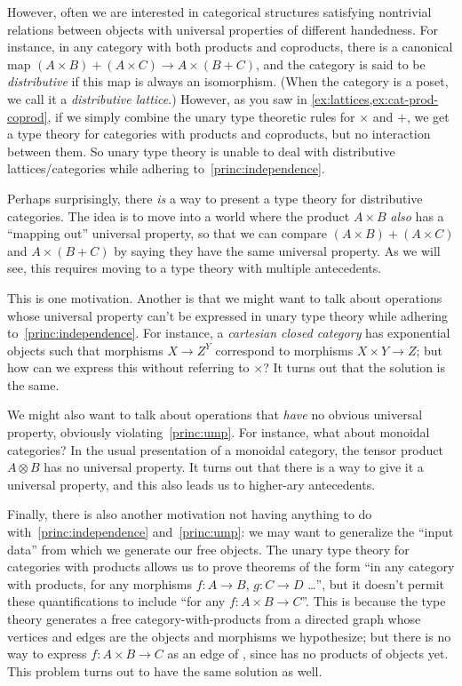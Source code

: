 \documentclass{book}
\begin{document}
However, often we are interested in categorical structures satisfying nontrivial relations between objects with universal properties of different handedness.
For instance, in any category with both products and coproducts, there is a canonical map $(A\times B)+(A\times C) \to A\times (B+C)$, and the category is said to be \emph{distributive} if this map is always an isomorphism.
(When the category is a poset, we call it a \emph{distributive lattice}.)
However, as you saw in \cref{ex:lattices,ex:cat-prod-coprod}, if we simply combine the unary type theoretic rules for $\times$ and $+$, we get a type theory for categories with products and coproducts, but no interaction between them.
So unary type theory is unable to deal with distributive lattices/categories while adhering to~\eqref{princ:independence}.

Perhaps surprisingly, there \emph{is} a way to present a type theory for distributive categories.
The idea is to move into a world where the product $A\times B$ \emph{also} has a ``mapping out'' universal property, so that we can compare $(A\times B)+(A\times C)$ and $A\times (B+C)$ by saying they have the same universal property.
As we will see, this requires moving to a type theory with multiple antecedents.

This is one motivation.
Another is that we might want to talk about operations whose universal property can't be expressed in unary type theory while adhering to~\eqref{princ:independence}.
For instance, a \emph{cartesian closed category} has exponential objects such that morphisms $X\to Z^Y$ correspond to morphisms $X\times Y\to Z$; but how can we express this without referring to $\times$?
It turns out that the solution is the same.

We might also want to talk about operations that \emph{have} no obvious universal property, obviously violating~\eqref{princ:ump}.
For instance, what about monoidal categories?
In the usual presentation of a monoidal category, the tensor product $A\otimes B$ has no universal property.
It turns out that there is a way to give it a universal property, and this also leads us to higher-ary antecedents.

Finally, there is also another motivation not having anything to do with~\eqref{princ:independence} and~\eqref{princ:ump}: we may want to generalize the ``input data'' \cG from which we generate our free objects.
The unary type theory for categories with products allows us to prove theorems of the form ``in any category with products, for any morphisms $f:A\to B$, $g:C\to D$ \dots'', but it doesn't permit these quantifications to include ``for any $f:A\times B\to C$''.
This is because the type theory generates a free category-with-products from a directed graph \cG whose vertices and edges are the objects and morphisms we hypothesize; but there is no way to express $f:A\times B\to C$ as an edge of \cG, since \cG has no products of objects yet.
This problem turns out to have the same solution as well.
\end{document}
